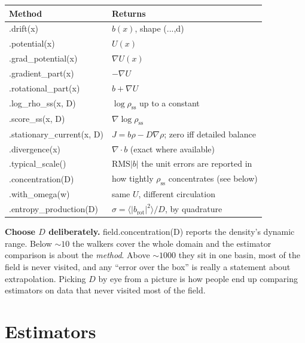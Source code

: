 \documentclass[11pt,a4paper]{article}
\newcommand{\code}[1]{{\ttfamily\small #1}}
\begin{document}
\begin{center}
\begin{tabular}{@{}L{0.32\textwidth} L{0.62\textwidth}@{}}
\toprule
\textbf{Method} & \textbf{Returns} \\
\midrule
\code{.drift(x)}              & $b(x)$, shape \code{(...,d)} \\
\code{.potential(x)}          & $U(x)$ \\
\code{.grad\_potential(x)}    & $\nabla U(x)$ \\
\code{.gradient\_part(x)}     & $-\nabla U$ \\
\code{.rotational\_part(x)}   & $b + \nabla U$ \\
\code{.log\_rho\_ss(x, D)}    & $\log\rho_{\mathrm{ss}}$ up to a constant \\
\code{.score\_ss(x, D)}       & $\nabla\log\rho_{\mathrm{ss}}$ \\
\code{.stationary\_current(x, D)} & $J = b\rho - D\nabla\rho$; zero iff detailed balance \\
\code{.divergence(x)}         & $\nabla\!\cdot\!b$ (exact where available) \\
\code{.typical\_scale()}      & $\mathrm{RMS}|b|$ \textemdash{} the unit errors are reported in \\
\code{.concentration(D)}      & how tightly $\rho_{\mathrm{ss}}$ concentrates (see below) \\
\code{.with\_omega(w)}        & same $U$, different circulation \\
\code{.entropy\_production(D)}& $\sigma = \langle|b_{\mathrm{rot}}|^2\rangle/D$, by quadrature \\
\bottomrule
\end{tabular}
\end{center}

\begin{warnbox}
\textbf{Choose $D$ deliberately.} \code{field.concentration(D)} reports the density's
dynamic range. Below $\sim10$ the walkers cover the whole domain and the estimator
comparison is about the \emph{method}. Above $\sim1000$ they sit in one basin, most of
the field is never visited, and any ``error over the box'' is really a statement about
extrapolation. Picking $D$ by eye from a picture is how people end up comparing
estimators on data that never visited most of the field.
\end{warnbox}

\clearpage
\section{Estimators}
\end{document}
